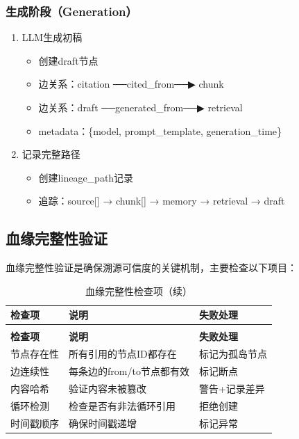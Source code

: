 \documentclass[12pt,a4paper,oneside]{article}
\begin{document}
\subsubsection{生成阶段（Generation）}

\begin{enumerate}[\arabic*)]
    \item LLM生成初稿
    \begin{itemize}
        \item 创建draft节点
        \item 边关系：citation ──cited\_from──▶ chunk
        \item 边关系：draft ──generated\_from──▶ retrieval
        \item metadata：\{model, prompt\_template, generation\_time\}
    \end{itemize}
    \item 记录完整路径
    \begin{itemize}
        \item 创建lineage\_path记录
        \item 追踪：source[] → chunk[] → memory → retrieval → draft
    \end{itemize}
\end{enumerate}

\subsection{血缘完整性验证}

血缘完整性验证是确保溯源可信度的关键机制，主要检查以下项目：

\begin{longtable}{p{3cm}p{4cm}p{4cm}}
    \caption{血缘完整性检查项} \\
    \toprule
    \textbf{检查项} & \textbf{说明} & \textbf{失败处理} \\
    \midrule
    \endfirsthead
    \caption{血缘完整性检查项（续）} \\
    \toprule
    \textbf{检查项} & \textbf{说明} & \textbf{失败处理} \\
    \midrule
    \endhead
    节点存在性 & 所有引用的节点ID都存在 & 标记为孤岛节点 \\
    边连续性 & 每条边的from/to节点都有效 & 标记断点 \\
    内容哈希 & 验证内容未被篡改 & 警告+记录差异 \\
    循环检测 & 检查是否有非法循环引用 & 拒绝创建 \\
    时间戳顺序 & 确保时间戳递增 & 标记异常 \\
    \bottomrule
\end{longtable}
\end{document}
